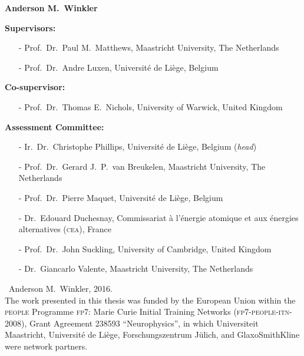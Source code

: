 \vfill

\begin{center}
\begin{Large}
\textbf{Anderson M.\ Winkler}
\end{Large}
\end{center}

\vspace*{3cm}
\vspace*{\fill}

\newpage
{}
\noindent
\textbf{Supervisors:}
\begin{itemize}[leftmargin=0mm]
\item[-] Prof.\ Dr.\ Paul M.\ Matthews, Maastricht University, The Netherlands
\item[-] Prof.\ Dr.\ Andre Luxen, Universit\'{e} de Li\`{e}ge, Belgium
\end{itemize}

\vspace*{5mm}

\noindent
\textbf{Co-supervisor:}
\begin{itemize}[leftmargin=0mm]
\item[-] Prof.\ Dr.\ Thomas E.\ Nichols, University of Warwick, United Kingdom
\end{itemize}

\vspace*{5mm}

\noindent
\textbf{Assessment Committee:}
\begin{itemize}[leftmargin=0mm]
\setlength\itemsep{0mm}
\item[-] Ir.\ Dr.\ Christophe Phillips, Universit\'{e} de Li\`{e}ge, Belgium (\emph{head})
\item[-] Prof.\ Dr.\ Gerard J.\ P.\ van Breukelen, Maastricht University, The Netherlands
\item[-] Prof.\ Dr.\ Pierre Maquet, Universit\'{e} de Li\`{e}ge, Belgium
\item[-] Dr.\ Edouard Duchesnay, Commissariat \`{a} l'\'{e}nergie atomique et aux \'{e}nergies alternatives (\textsc{cea}), France
\item[-] Prof.\ Dr.\ John Suckling, University of Cambridge, United Kingdom
\item[-] Dr.\ Giancarlo Valente, Maastricht University, The Netherlands
\end{itemize}

\vfill

\noindent
\textcopyright\ Anderson M.\ Winkler, 2016.\\
The work presented in this thesis was funded by the European Union within the \textsc{people} Programme \textsc{fp7}: Marie Curie Initial Training Networks (\textsc{fp7-people-itn-2008}), Grant Agreement 238593 ``Neurophysics'', in which Universiteit Maas\-tricht, Universit\'{e} de Li\`{e}ge, Forschungszentrum J\"{u}lich, and GlaxoSmithKline were network partners.

